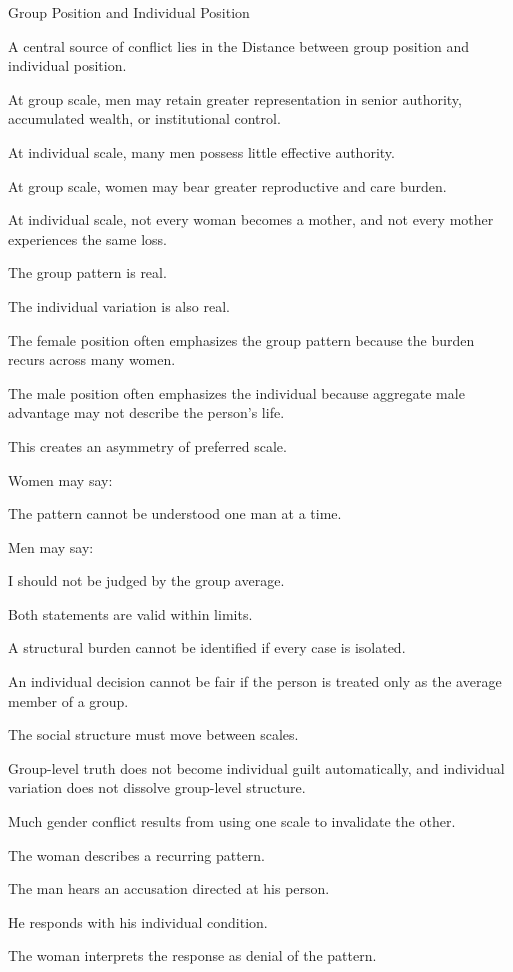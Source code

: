 Group Position and Individual Position

A central source of conflict lies in the Distance between group position and individual position.

At group scale, men may retain greater representation in senior authority, accumulated wealth, or institutional control.

At individual scale, many men possess little effective authority.

At group scale, women may bear greater reproductive and care burden.

At individual scale, not every woman becomes a mother, and not every mother experiences the same loss.

The group pattern is real.

The individual variation is also real.

The female position often emphasizes the group pattern because the burden recurs across many women.

The male position often emphasizes the individual because aggregate male advantage may not describe the person’s life.

This creates an asymmetry of preferred scale.

Women may say:

The pattern cannot be understood one man at a time.

Men may say:

I should not be judged by the group average.

Both statements are valid within limits.

A structural burden cannot be identified if every case is isolated.

An individual decision cannot be fair if the person is treated only as the average member of a group.

The social structure must move between scales.

Group-level truth does not become individual guilt automatically, and individual variation does not dissolve group-level structure.

Much gender conflict results from using one scale to invalidate the other.

The woman describes a recurring pattern.

The man hears an accusation directed at his person.

He responds with his individual condition.

The woman interprets the response as denial of the pattern.

